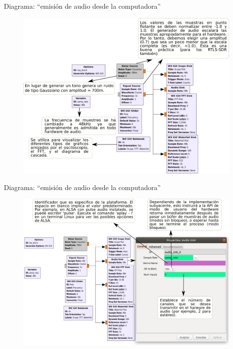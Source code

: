 \begin{frame}{Diagrama:  ``emisión de audio desde la computadora''}

\begin{figure}

\begin{center}
\vspace{-2mm}
    \includegraphics[width=.85\textwidth]{parte1/lab4/pdf/lab4_2.pdf}
\end{center}
\end{figure}

\end{frame}

\begin{frame}{Diagrama:  ``emisión de audio desde la computadora''}

\begin{figure}

\begin{center}
\vspace{-1mm}
\includegraphics[width=.92\textwidth]{parte1/lab4/pdf/lab4_3.pdf}
\end{center}
\end{figure}

\end{frame}

